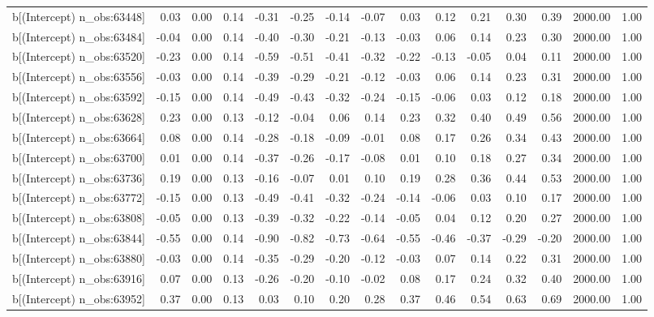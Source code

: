 \begin{table}[ht]
\begin{tabular}{rrrrrrrrrrrrrrr}
  b[(Intercept) n\_obs:63448] & 0.03 & 0.00 & 0.14 & -0.31 & -0.25 & -0.14 & -0.07 & 0.03 & 0.12 & 0.21 & 0.30 & 0.39 & 2000.00 & 1.00 \\ 
  b[(Intercept) n\_obs:63484] & -0.04 & 0.00 & 0.14 & -0.40 & -0.30 & -0.21 & -0.13 & -0.03 & 0.06 & 0.14 & 0.23 & 0.30 & 2000.00 & 1.00 \\ 
  b[(Intercept) n\_obs:63520] & -0.23 & 0.00 & 0.14 & -0.59 & -0.51 & -0.41 & -0.32 & -0.22 & -0.13 & -0.05 & 0.04 & 0.11 & 2000.00 & 1.00 \\ 
  b[(Intercept) n\_obs:63556] & -0.03 & 0.00 & 0.14 & -0.39 & -0.29 & -0.21 & -0.12 & -0.03 & 0.06 & 0.14 & 0.23 & 0.31 & 2000.00 & 1.00 \\ 
  b[(Intercept) n\_obs:63592] & -0.15 & 0.00 & 0.14 & -0.49 & -0.43 & -0.32 & -0.24 & -0.15 & -0.06 & 0.03 & 0.12 & 0.18 & 2000.00 & 1.00 \\ 
  b[(Intercept) n\_obs:63628] & 0.23 & 0.00 & 0.13 & -0.12 & -0.04 & 0.06 & 0.14 & 0.23 & 0.32 & 0.40 & 0.49 & 0.56 & 2000.00 & 1.00 \\ 
  b[(Intercept) n\_obs:63664] & 0.08 & 0.00 & 0.14 & -0.28 & -0.18 & -0.09 & -0.01 & 0.08 & 0.17 & 0.26 & 0.34 & 0.43 & 2000.00 & 1.00 \\ 
  b[(Intercept) n\_obs:63700] & 0.01 & 0.00 & 0.14 & -0.37 & -0.26 & -0.17 & -0.08 & 0.01 & 0.10 & 0.18 & 0.27 & 0.34 & 2000.00 & 1.00 \\ 
  b[(Intercept) n\_obs:63736] & 0.19 & 0.00 & 0.13 & -0.16 & -0.07 & 0.01 & 0.10 & 0.19 & 0.28 & 0.36 & 0.44 & 0.53 & 2000.00 & 1.00 \\ 
  b[(Intercept) n\_obs:63772] & -0.15 & 0.00 & 0.13 & -0.49 & -0.41 & -0.32 & -0.24 & -0.14 & -0.06 & 0.03 & 0.10 & 0.17 & 2000.00 & 1.00 \\ 
  b[(Intercept) n\_obs:63808] & -0.05 & 0.00 & 0.13 & -0.39 & -0.32 & -0.22 & -0.14 & -0.05 & 0.04 & 0.12 & 0.20 & 0.27 & 2000.00 & 1.00 \\ 
  b[(Intercept) n\_obs:63844] & -0.55 & 0.00 & 0.14 & -0.90 & -0.82 & -0.73 & -0.64 & -0.55 & -0.46 & -0.37 & -0.29 & -0.20 & 2000.00 & 1.00 \\ 
  b[(Intercept) n\_obs:63880] & -0.03 & 0.00 & 0.14 & -0.35 & -0.29 & -0.20 & -0.12 & -0.03 & 0.07 & 0.14 & 0.22 & 0.31 & 2000.00 & 1.00 \\ 
  b[(Intercept) n\_obs:63916] & 0.07 & 0.00 & 0.13 & -0.26 & -0.20 & -0.10 & -0.02 & 0.08 & 0.17 & 0.24 & 0.32 & 0.40 & 2000.00 & 1.00 \\ 
  b[(Intercept) n\_obs:63952] & 0.37 & 0.00 & 0.13 & 0.03 & 0.10 & 0.20 & 0.28 & 0.37 & 0.46 & 0.54 & 0.63 & 0.69 & 2000.00 & 1.00 \\ 

\end{tabular}
\end{table}
